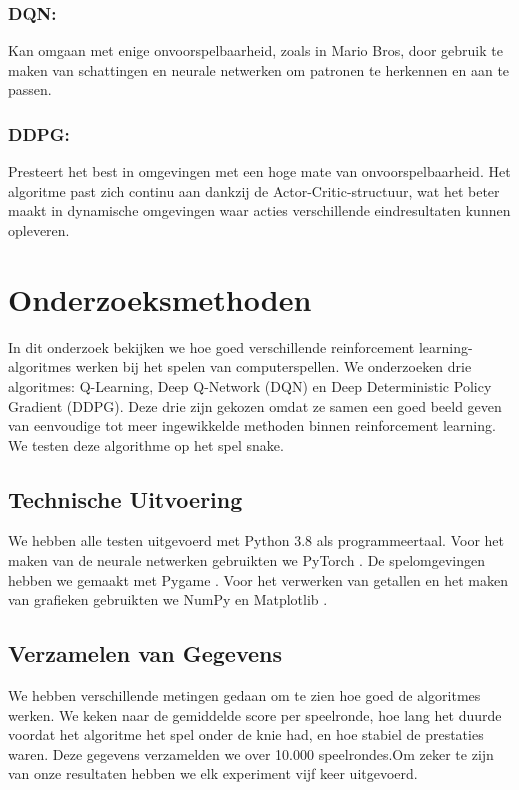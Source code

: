 \documentclass[a4paper,11pt]{report}-
\begin{document}
\subsection*{DQN:}
Kan omgaan met enige onvoorspelbaarheid, zoals in Mario Bros, door gebruik te
maken van schattingen en neurale netwerken om patronen te herkennen en aan te
passen.

\subsection*{DDPG:}
Presteert het best in omgevingen met een hoge mate van onvoorspelbaarheid. Het
algoritme past zich continu aan dankzij de Actor-Critic-structuur, wat het
beter maakt in dynamische omgevingen waar acties verschillende eindresultaten
kunnen opleveren.

\chapter{Onderzoeksmethoden}
In dit onderzoek bekijken we hoe goed verschillende reinforcement
learning-algoritmes werken bij het spelen van computerspellen. We onderzoeken
drie algoritmes: Q-Learning, Deep Q-Network (DQN) en Deep Deterministic Policy
Gradient (DDPG). Deze drie zijn gekozen omdat ze samen een goed beeld geven van
eenvoudige tot meer ingewikkelde methoden binnen reinforcement learning. We
testen deze algorithme op het spel snake.

\section{Technische Uitvoering}
We hebben alle testen uitgevoerd met Python 3.8 \cite{python_docs} als
programmeertaal. Voor het maken van de neurale netwerken gebruikten we PyTorch
\cite{pytorch_docs}. De spelomgevingen hebben we gemaakt met Pygame
\cite{pygame}. Voor het verwerken van getallen en het maken van grafieken
gebruikten we NumPy \cite{numpy_docs} en Matplotlib \cite{matplotlib_docs}.

\section{Verzamelen van Gegevens}
We hebben verschillende metingen gedaan om te zien hoe goed de algoritmes
werken. We keken naar de gemiddelde score per speelronde, hoe lang het duurde
voordat het algoritme het spel onder de knie had, en hoe stabiel de prestaties
waren. Deze gegevens verzamelden we over 10.000 speelrondes.Om zeker te zijn
van onze resultaten hebben we elk experiment vijf keer uitgevoerd.
\end{document}
